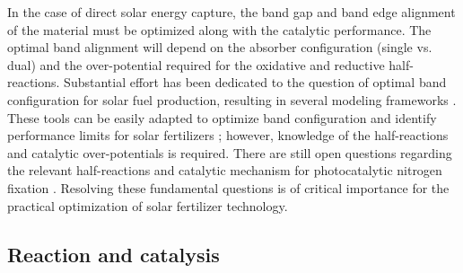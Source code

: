 In the case of direct solar energy capture, the band gap and band edge alignment of the material must be optimized along with the catalytic performance. The optimal band alignment will depend on the absorber configuration (single vs. dual) and the over-potential required for the oxidative and reductive half-reactions. Substantial effort has been dedicated to the question of optimal band configuration for solar fuel production, resulting in several modeling frameworks \cite{Seitz_2014, Seger_2016}. These tools can be easily adapted to optimize band configuration and identify performance limits for solar fertilizers \cite{Medford_2017}; however, knowledge of the half-reactions and catalytic over-potentials is required. There are still open questions regarding the relevant half-reactions and catalytic mechanism for photocatalytic nitrogen fixation \cite{Davies1995,Medford_2017,Comer_2018,Comer_JACS}. Resolving these fundamental questions is of critical importance for the practical optimization of solar fertilizer technology.

\subsection{Reaction and catalysis}
\label{sec:reaction}


